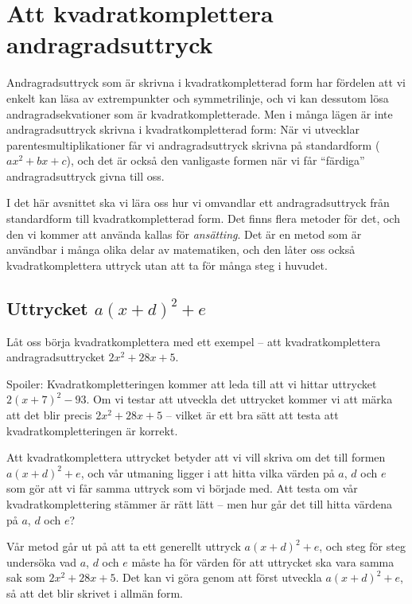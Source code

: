 \section{Att kvadratkomplettera andragradsuttryck}

Andragradsuttryck som är skrivna i kvadratkompletterad form har fördelen att vi enkelt kan läsa av extrempunkter och symmetrilinje, och vi kan dessutom lösa andragradsekvationer som är kvadratkompletterade.
Men i många lägen är inte andragradsuttryck skrivna i kvadratkompletterad form:
När vi utvecklar parentesmultiplikationer får vi andragradsuttryck skrivna på standardform ($ax^2+bx+c$), och det är också den vanligaste formen när vi får ``färdiga'' andragradsuttryck givna till oss.

I det här avsnittet ska vi lära oss hur vi omvandlar ett andragradsuttryck från standardform till kvadratkompletterad form.
Det finns flera metoder för det, och den vi kommer att använda kallas för \emph{ansätting}.
Det är en metod som är användbar i många olika delar av matematiken, och den låter oss också kvadratkomplettera uttryck utan att ta för många steg i huvudet.

\subsection{Uttrycket $a(x+d)^2+e$}

Låt oss börja kvadratkomplettera med ett exempel -- att kvadratkomplettera andragradsuttrycket $2x^2+28x+5$.

Spoiler: Kvadratkompletteringen kommer att leda till att vi hittar uttrycket $2(x+7)^2-93$.
Om vi testar att utveckla det uttrycket kommer vi att märka att det blir precis $2x^2+28x+5$ -- vilket är ett bra sätt att testa att kvadratkompletteringen är korrekt.

Att kvadratkomplettera uttrycket betyder att vi vill skriva om det till formen $a(x+d)^2+e$, och vår utmaning ligger i att hitta vilka värden på $a$, $d$ och $e$ som gör att vi får samma uttryck som vi började med.
Att testa om vår kvadratkomplettering stämmer är rätt lätt -- men hur går det till hitta värdena på $a$, $d$ och $e$?

Vår metod går ut på att ta ett generellt uttryck $a(x+d)^2+e$, och steg för steg undersöka vad $a$, $d$ och $e$ måste ha för värden för att uttrycket ska vara samma sak som $2x^2+28x+5$.
Det kan vi göra genom att först utveckla $a(x+d)^2+e$, så att det blir skrivet i allmän form.

